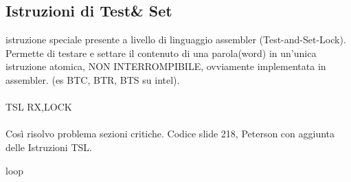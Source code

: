 \documentclass{article}
\begin{document}
\subsection{Istruzioni di Test\& Set}
istruzione speciale presente a livello di linguaggio assembler (Test-and-Set-Lock). Permette di testare e settare il contenuto di una parola(word) in un'unica istruzione atomica, NON INTERROMPIBILE, ovviamente implementata in assembler. (es BTC, BTR, BTS su intel).\\
\\
TSL RX,LOCK\\
\\
Così risolvo problema sezioni critiche. Codice slide 218, Peterson con aggiunta delle Istruzioni TSL.

loop 
\end{document}
